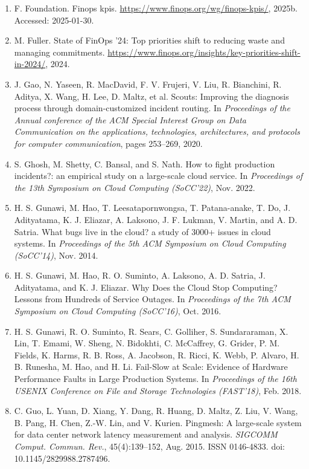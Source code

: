 \begin{enumerate}[leftmargin=2em,itemsep=2pt]
\item F. Foundation. Finops kpis. \url{https://www.finops.org/wg/finops-kpis/}, 2025b. Accessed: 2025-01-30.

\item M. Fuller. State of FinOps '24: Top priorities shift to reducing waste and managing commitments. \url{https://www.finops.org/insights/key-priorities-shift-in-2024/}, 2024.

\item J. Gao, N. Yaseen, R. MacDavid, F. V. Frujeri, V. Liu, R. Bianchini, R. Aditya, X. Wang, H. Lee, D. Maltz, et al. Scouts: Improving the diagnosis process through domain-customized incident routing. In \textit{Proceedings of the Annual conference of the ACM Special Interest Group on Data Communication on the applications, technologies, architectures, and protocols for computer communication}, pages 253--269, 2020.

\item S. Ghosh, M. Shetty, C. Bansal, and S. Nath. How to fight production incidents?: an empirical study on a large-scale cloud service. In \textit{Proceedings of the 13th Symposium on Cloud Computing (SoCC'22)}, Nov. 2022.

\item H. S. Gunawi, M. Hao, T. Leesatapornwongsa, T. Patana-anake, T. Do, J. Adityatama, K. J. Eliazar, A. Laksono, J. F. Lukman, V. Martin, and A. D. Satria. What bugs live in the cloud? a study of 3000+ issues in cloud systems. In \textit{Proceedings of the 5th ACM Symposium on Cloud Computing (SoCC'14)}, Nov. 2014.

\item H. S. Gunawi, M. Hao, R. O. Suminto, A. Laksono, A. D. Satria, J. Adityatama, and K. J. Eliazar. Why Does the Cloud Stop Computing? Lessons from Hundreds of Service Outages. In \textit{Proceedings of the 7th ACM Symposium on Cloud Computing (SoCC'16)}, Oct. 2016.

\item H. S. Gunawi, R. O. Suminto, R. Sears, C. Golliher, S. Sundararaman, X. Lin, T. Emami, W. Sheng, N. Bidokhti, C. McCaffrey, G. Grider, P. M. Fields, K. Harms, R. B. Ross, A. Jacobson, R. Ricci, K. Webb, P. Alvaro, H. B. Runesha, M. Hao, and H. Li. Fail-Slow at Scale: Evidence of Hardware Performance Faults in Large Production Systems. In \textit{Proceedings of the 16th USENIX Conference on File and Storage Technologies (FAST'18)}, Feb. 2018.

\item C. Guo, L. Yuan, D. Xiang, Y. Dang, R. Huang, D. Maltz, Z. Liu, V. Wang, B. Pang, H. Chen, Z.-W. Lin, and V. Kurien. Pingmesh: A large-scale system for data center network latency measurement and analysis. \textit{SIGCOMM Comput. Commun. Rev.}, 45(4):139--152, Aug. 2015. ISSN 0146-4833. doi: 10.1145/2829988.2787496.


\end{enumerate}
